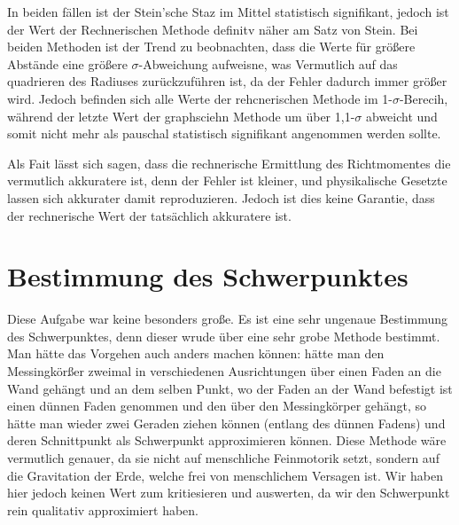 In beiden fällen ist der Stein'sche Staz im Mittel statistisch signifikant, jedoch ist der Wert der Rechnerischen Methode definitv näher am Satz von Stein. 
Bei beiden Methoden ist der Trend zu beobnachten, dass die Werte für größere Abstände eine größere $\sigma$-Abweichung aufweisne, was Vermutlich auf das quadrieren des Radiuses zurückzuführen ist, da der Fehler dadurch immer größer wird.
Jedoch befinden sich alle Werte der rehcnerischen Methode im 1-$\sigma$-Berecih, während der letzte Wert der graphsciehn Methode um über 1,1-$\sigma$ abweicht und somit nicht mehr als pauschal statistisch signifikant angenommen werden sollte.

Als Fait lässt sich sagen, dass die rechnerische Ermittlung des Richtmomentes die vermutlich akkuratere ist, denn der Fehler ist kleiner, und physikalische Gesetzte lassen sich akkurater damit reproduzieren.
Jedoch ist dies keine Garantie, dass der rechnerische Wert der tatsächlich akkuratere ist.

\section{Bestimmung des Schwerpunktes}
Diese Aufgabe war keine besonders große. Es ist eine sehr ungenaue Bestimmung des Schwerpunktes, denn dieser wrude über eine sehr grobe Methode bestimmt. Man hätte das Vorgehen auch anders machen können:
hätte man den Messingkörßer zweimal in verschiedenen Ausrichtungen über einen Faden an die Wand gehängt und an dem selben Punkt, wo der Faden an der Wand befestigt ist einen dünnen Faden genommen und den über den Messingkörper gehängt,
so hätte man wieder zwei Geraden ziehen können (entlang des dünnen Fadens) und deren Schnittpunkt als Schwerpunkt approximieren können. Diese Methode wäre vermutlich genauer, da sie nicht auf menschliche Feinmotorik setzt, sondern 
auf die Gravitation der Erde, welche frei von menschlichem Versagen ist. Wir haben hier jedoch keinen Wert zum kritiesieren und auswerten, da wir den Schwerpunkt rein qualitativ approximiert haben.

